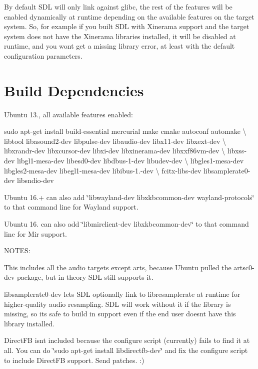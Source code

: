 By default S\+DL will only link against glibc, the rest of the features will be enabled dynamically at runtime depending on the available features on the target system. So, for example if you built S\+DL with Xinerama support and the target system does not have the Xinerama libraries installed, it will be disabled at runtime, and you won\textquotesingle{}t get a missing library error, at least with the default configuration parameters.



 \section*{Build Dependencies }

Ubuntu 13., all available features enabled\+:

sudo apt-\/get install build-\/essential mercurial make cmake autoconf automake \textbackslash{} libtool libasound2-\/dev libpulse-\/dev libaudio-\/dev libx11-\/dev libxext-\/dev \textbackslash{} libxrandr-\/dev libxcursor-\/dev libxi-\/dev libxinerama-\/dev libxxf86vm-\/dev \textbackslash{} libxss-\/dev libgl1-\/mesa-\/dev libesd0-\/dev libdbus-\/1-\/dev libudev-\/dev \textbackslash{} libgles1-\/mesa-\/dev libgles2-\/mesa-\/dev libegl1-\/mesa-\/dev libibus-\/1.-\/dev \textbackslash{} fcitx-\/libs-\/dev libsamplerate0-\/dev libsndio-\/dev

Ubuntu 16.+ can also add \char`\"{}libwayland-\/dev libxkbcommon-\/dev wayland-\/protocols\char`\"{} to that command line for Wayland support.

Ubuntu 16. can also add \char`\"{}libmirclient-\/dev libxkbcommon-\/dev\char`\"{} to that command line for Mir support.

N\+O\+T\+ES\+:
\begin{DoxyItemize}
\item This includes all the audio targets except arts, because Ubuntu pulled the artsc0-\/dev package, but in theory S\+DL still supports it.
\item libsamplerate0-\/dev lets S\+DL optionally link to libresamplerate at runtime for higher-\/quality audio resampling. S\+DL will work without it if the library is missing, so it\textquotesingle{}s safe to build in support even if the end user doesn\textquotesingle{}t have this library installed.
\item Direct\+FB isn\textquotesingle{}t included because the configure script (currently) fails to find it at all. You can do \char`\"{}sudo apt-\/get install libdirectfb-\/dev\char`\"{} and fix the configure script to include Direct\+FB support. Send patches. \+:)
\end{DoxyItemize}



